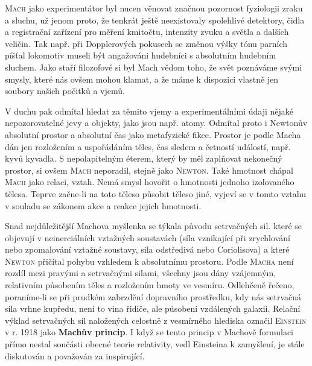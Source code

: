         \textsc{Mach} jako experimentátor byl nucen věnovat značnou pozornost fyziologii zraku a
        sluchu, už jenom proto, že tenkrát ještě neexistovaly spolehlivé detektory, čidla a
        registrační zařízení pro měření kmitočtu, intenzity zvuku a světla a dalších veličin. Tak
        např. při Dopplerových pokusech se změnou výšky tónu parních píšťal lokomotiv museli být
        angažováni hudebníci s absolutním hudebním sluchem. Jako staří filozofové si byl Mach vědom
        toho, že svět poznáváme svými smysly, které nás ovšem mohou klamat, a že máme k dispozici
        vlastně jen soubory našich počitků a vjemů.

        V duchu \wikiPozitivismus pak odmítal hledat za těmito vjemy a experimentálními údaji
        nějaké nepozorovatelné jevy a objekty, jako jsou např. atomy. Odmítal proto i Newtonův
        absolutní prostor a absolutní čas jako metafyzické fikce. Prostor je podle Macha dán jen
        rozložením a uspořádáním těles, čas sledem a četností událostí, např. kyvů kyvadla. S
        nepolapitelným éterem, který by měl zaplňovat nekonečný prostor, si ovšem \textsc{Mach}
        neporadil, stejně jako \textsc{Newton}. Také hmotnost chápal \textsc{Mach} jako relaci,
        vztah. Nemá smysl hovořit o hmotnosti jednoho izolovaného tělesa. Teprve začne-li na toto
        těleso působit těleso jiné, vyjeví se v tomto vztahu v souladu se zákonem akce a reakce
        jejich hmotnosti.

        Snad nejdůležitější Machova myšlenka se týkala původu setrvačných sil. které se objevují v
        neinerciálních vztažných soustavách (síla vznikající při zrychlování nebo zpomalování
        vztažné soustavy, sila odstředivá nebo Coriolisova) a které \textsc{Newton} přičítal pohybu
        vzhledem k absolutnímu prostoru. Podle \textsc{Macha} není rozdíl mezi pravými a setrvačnými
        silami, všechny jsou dány vzájemným, relativním působením těles a rozložením hmoty ve
        vesmíru. Odlehčeně řečeno, poraníme-li se při prudkém zabrzdění dopravního prostředku, kdy
        nás setrvačná síla vrhne kupředu, není to vina řidiče, ale působení vzdálených galaxii.
        Relační výklad setrvačných sil naložených celostně z vesmírného hlediska označil
        \textsc{Einstein} v r. 1918 jako \textbf{Machův princip}. I když se tento princip v Machově
        formulaci přímo nestal součásti obecné teorie relativity, vedl Einsteina k zamyšlení, je
        stále diskutován a považován za inspirující.

